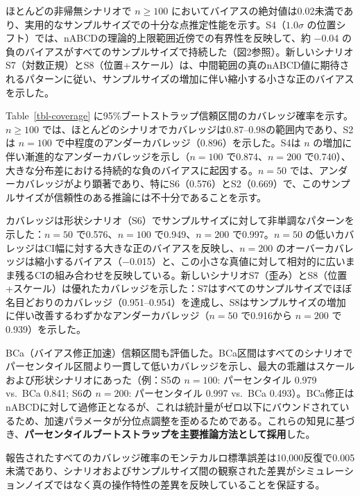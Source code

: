 \documentclass[
  a4paper,
  11pt]{ltjsarticle}
\begin{document}
ほとんどの非帰無シナリオで \(n \geq 100\)
においてバイアスの絶対値は0.02未満であり、実用的なサンプルサイズでの十分な点推定性能を示す。S4（\(1.0\sigma\)
の位置シフト）では、nABCDの理論的上限範囲近傍での有界性を反映して、約
−0.04
の負のバイアスがすべてのサンプルサイズで持続した（図2参照）。新しいシナリオS7（対数正規）とS8（位置+スケール）は、中間範囲の真のnABCD値に期待されるパターンに従い、サンプルサイズの増加に伴い縮小する小さな正のバイアスを示した。

Table~\ref{tbl-coverage}
に95\%ブートストラップ信頼区間のカバレッジ確率を示す。\(n \geq 100\)
では、ほとんどのシナリオでカバレッジは0.87--0.98の範囲内であり、S2は
\(n = 100\) で中程度のアンダーカバレッジ（0.896）を示した。S4は \(n\)
の増加に伴い漸進的なアンダーカバレッジを示し（\(n = 100\)
で0.874、\(n = 200\)
で0.740）、大きな分布差における持続的な負のバイアスに起因する。\(n = 50\)
では、アンダーカバレッジがより顕著であり、特にS6（0.576）とS2（0.669）で、このサンプルサイズが信頼性のある推論には不十分であることを示す。

カバレッジは形状シナリオ（S6）でサンプルサイズに対して非単調なパターンを示した：\(n = 50\)
で0.576、\(n = 100\) で0.949、\(n = 200\) で0.997。\(n = 50\)
の低いカバレッジはCI幅に対する大きな正のバイアスを反映し、\(n = 200\)
のオーバーカバレッジは縮小するバイアス（−0.015）と、この小さな真値に対して相対的に広いまま残るCIの組み合わせを反映している。新しいシナリオS7（歪み）とS8（位置+スケール）は優れたカバレッジを示した：S7はすべてのサンプルサイズでほぼ名目どおりのカバレッジ（0.951--0.954）を達成し、S8はサンプルサイズの増加に伴い改善するわずかなアンダーカバレッジ（\(n=50\)
で0.916から \(n=200\) で0.939）を示した。

BCa（バイアス修正加速）信頼区間も評価した。BCa区間はすべてのシナリオでパーセンタイル区間より一貫して低いカバレッジを示し、最大の乖離はスケールおよび形状シナリオにあった（例：S5の
\(n = 100\): パーセンタイル 0.979 vs.~BCa 0.841; S6の \(n = 200\):
パーセンタイル 0.997 vs.~BCa
0.493）。BCa修正はnABCDに対して過修正となるが、これは統計量がゼロ以下にバウンドされているため、加速パラメータが分位点調整を歪めるためである。これらの知見に基づき、\textbf{パーセンタイルブートストラップを主要推論方法として採用}した。

報告されたすべてのカバレッジ確率のモンテカルロ標準誤差は10,000反復で0.005未満であり、シナリオおよびサンプルサイズ間の観察された差異がシミュレーションノイズではなく真の操作特性の差異を反映していることを保証する。
\end{document}
